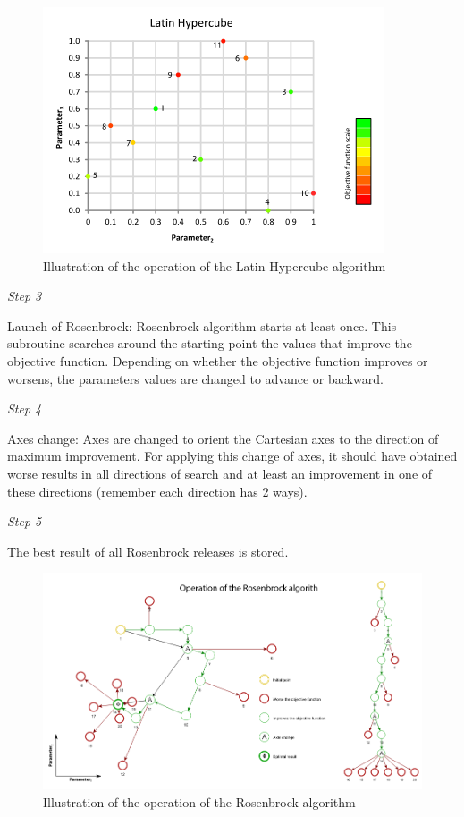 \documentclass[
  letterpaper,
  DIV=11,
  numbers=noendperiod]{scrreprt}
\begin{document}
\begin{figure}

{\centering \includegraphics{./figures/fig-operation_hypercube.png}

}

\caption{\label{fig-operation_hypercube}Illustration of the operation of
the Latin Hypercube algorithm}

\end{figure}

\emph{Step 3}

Launch of Rosenbrock: Rosenbrock algorithm starts at least once. This
subroutine searches around the starting point the values that improve
the objective function. Depending on whether the objective function
improves or worsens, the parameters values are changed to advance or
backward.

\emph{Step 4}

Axes change: Axes are changed to orient the Cartesian axes to the
direction of maximum improvement. For applying this change of axes, it
should have obtained worse results in all directions of search and at
least an improvement in one of these directions (remember each direction
has 2 ways).

\emph{Step 5}

The best result of all Rosenbrock releases is stored.

\begin{figure}

{\centering \includegraphics{./figures/fig-operation_rosenbrock.png}

}

\caption{\label{fig-operation_rosenbrock}Illustration of the operation
of the Rosenbrock algorithm}

\end{figure}
\end{document}
